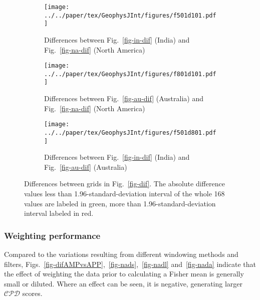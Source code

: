 \begin{figure*}
	\centering
	\begin{subfigure}{1.01\textwidth}
		\texttt{[image: ../../paper/tex/GeophysJInt/figures/f501d101.pdf]}
		\caption{Differences between Fig.~\ref{fig-in-dif} (India) and
		Fig.~\ref{fig-na-dif} (North America)}\label{fig-i-n-dif}
	\end{subfigure}
	\vspace{.1em}
	\begin{subfigure}{1.01\textwidth}
		\texttt{[image: ../../paper/tex/GeophysJInt/figures/f801d101.pdf]}
		\caption{Differences between Fig.~\ref{fig-au-dif} (Australia) and
		Fig.~\ref{fig-na-dif} (North America)}\label{fig-a-n-dif}
	\end{subfigure}
	\vspace{.1em}
	\begin{subfigure}{1.01\textwidth}
		\texttt{[image: ../../paper/tex/GeophysJInt/figures/f501d801.pdf]}
		\caption{Differences between Fig.~\ref{fig-in-dif} (India) and
		Fig.~\ref{fig-au-dif} (Australia)}\label{fig-i-a-dif}
	\end{subfigure}
	\caption[Differences of $\mathcal{CPD}$ of each plate's paleomagnetic
APWPs vs its FHM predicted APWP]{Differences between grids in
Fig.~\ref{fig-dif}. The absolute difference values less than
1.96-standard-deviation interval of the whole 168 values are labeled in green,
more than 1.96-standard-deviation interval labeled in red.}\label{fig-d-dif}
\end{figure*}

\subsubsection{Weighting performance}

Compared to the variations resulting from different windowing methods and
filters, Figs.~\ref{fig-difAMPvsAPP},~\ref{fig-nads},~\ref{fig-nadl}
and~\ref{fig-nada} indicate that the effect of weighting the data prior to
calculating a Fisher mean is generally small or diluted. Where an effect can be
seen, it is negative, generating larger $\mathcal{CPD}$ scores.


